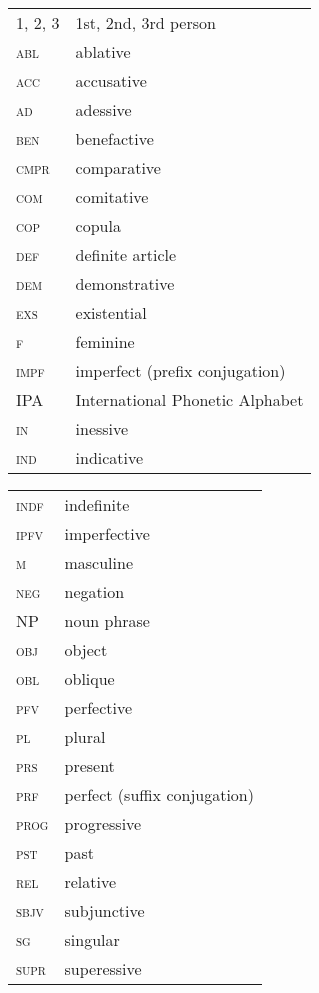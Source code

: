 \documentclass[output=paper]{langsci/langscibook}
\begin{document}
\begin{tabularx}{.5\textwidth}{@{}lQ@{}}
\textsc{1, 2, 3} & 1st, 2nd, 3rd person \\
\textsc{abl} & ablative \\
\textsc{acc} & accusative \\
\textsc{ad} & adessive \\
\textsc{ben} & benefactive \\
\textsc{cmpr} & {comparative} \\
\textsc{com} & comitative \\
\textsc{cop} & {copula} \\
\textsc{def} & {definite} {article} \\
\textsc{dem} & demonstrative \\
\textsc{exs} & {existential} \\
\textsc{f} & feminine \\
\textsc{impf} & imperfect (prefix conjugation) \\
IPA & International Phonetic Alphabet\\
\textsc{in} & inessive \\
\textsc{ind} & indicative \\
\end{tabularx}%
\begin{tabularx}{.5\textwidth}{@{}lQ@{}}
\textsc{indf} & indefinite \\
\textsc{ipfv} & imperfective \\
\textsc{m} & masculine \\
\textsc{neg} & {negation} \\
NP & {noun phrase} \\
\textsc{obj} & object \\
\textsc{obl} & oblique \\
\textsc{pfv} & perfective \\
\textsc{pl} & plural \\
\textsc{prs} & present \\
\textsc{prf} & perfect (suffix conjugation) \\
\textsc{prog} & progressive \\
\textsc{pst} & past \\
\textsc{rel} & {relative} \\
\textsc{sbjv} & subjunctive \\
\textsc{sg} & singular \\
\textsc{supr} & superessive \\
\end{tabularx}%


\sloppy\printbibliography[heading=subbibliography,notkeyword=this]
\end{document}
